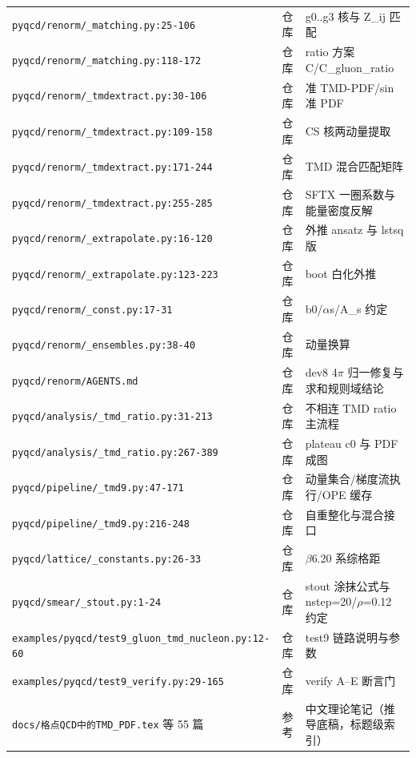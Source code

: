 \documentclass[UTF8]{ctexart}
\begin{document}
\begin{xltabular}{\textwidth}{XlX}
\texttt{\nolinkurl{pyqcd/renorm/_matching.py:25-106}} & 仓库 & g0..g3 核与 Z\_ij 匹配 \\
\texttt{\nolinkurl{pyqcd/renorm/_matching.py:118-172}} & 仓库 & ratio 方案 C/C\_gluon\_ratio \\
\texttt{\nolinkurl{pyqcd/renorm/_tmdextract.py:30-106}} & 仓库 & 准 TMD-PDF/sin 准 PDF \\
\texttt{\nolinkurl{pyqcd/renorm/_tmdextract.py:109-158}} & 仓库 & CS 核两动量提取 \\
\texttt{\nolinkurl{pyqcd/renorm/_tmdextract.py:171-244}} & 仓库 & TMD 混合匹配矩阵 \\
\texttt{\nolinkurl{pyqcd/renorm/_tmdextract.py:255-285}} & 仓库 & SFTX 一圈系数与能量密度反解 \\
\texttt{\nolinkurl{pyqcd/renorm/_extrapolate.py:16-120}} & 仓库 & 外推 ansatz 与 lstsq 版 \\
\texttt{\nolinkurl{pyqcd/renorm/_extrapolate.py:123-223}} & 仓库 & boot 白化外推 \\
\texttt{\nolinkurl{pyqcd/renorm/_const.py:17-31}} & 仓库 & b0/$\alpha$s/A\_s 约定 \\
\texttt{\nolinkurl{pyqcd/renorm/_ensembles.py:38-40}} & 仓库 & 动量换算 \\
\texttt{\nolinkurl{pyqcd/renorm/AGENTS.md}} & 仓库 & dev8 4$\pi$ 归一修复与求和规则域结论 \\
\texttt{\nolinkurl{pyqcd/analysis/_tmd_ratio.py:31-213}} & 仓库 & 不相连 TMD ratio 主流程 \\
\texttt{\nolinkurl{pyqcd/analysis/_tmd_ratio.py:267-389}} & 仓库 & plateau c0 与 PDF 成图 \\
\texttt{\nolinkurl{pyqcd/pipeline/_tmd9.py:47-171}} & 仓库 & 动量集合/梯度流执行/OPE 缓存 \\
\texttt{\nolinkurl{pyqcd/pipeline/_tmd9.py:216-248}} & 仓库 & 自重整化与混合接口 \\
\texttt{\nolinkurl{pyqcd/lattice/_constants.py:26-33}} & 仓库 & $\beta$6.20 系综格距 \\
\texttt{\nolinkurl{pyqcd/smear/_stout.py:1-24}} & 仓库 & stout 涂抹公式与 nstep=20/$\rho$=0.12 约定 \\
\texttt{\nolinkurl{examples/pyqcd/test9_gluon_tmd_nucleon.py:12-60}} & 仓库 & test9 链路说明与参数 \\
\texttt{\nolinkurl{examples/pyqcd/test9_verify.py:29-165}} & 仓库 & verify A--E 断言门 \\
\texttt{docs/格点QCD中的TMD\_PDF.tex} 等 55 篇 & 参考 & 中文理论笔记（推导底稿，标题级索引） \\

\end{xltabular}
\end{document}
